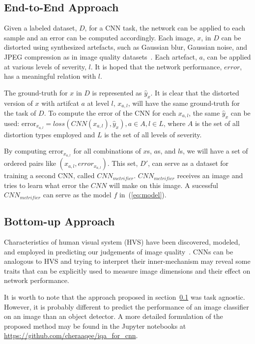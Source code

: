 \documentclass{article}
\begin{document}
\subsection{End-to-End Approach} \label{sec:end_to_end}
Given a labeled dataset, $D$, for a CNN task, the network can be applied to each sample and an error can be computed accordingly. Each image, $x$, in $D$ can be distorted using synthesized artefacts, such as Gaussian blur, Gaussian noise, and JPEG compression as in image quality datasets~\cite{sheikh2005live}. Each artefact, $a$, can be applied at various levels of severity, $l$. It is hoped that the network performance, $error$, has a meaningful relation with $l$.

The ground-truth for $x$ in $D$ is represented as $\hat{y}_x$. It is clear that the distorted version of $x$ with artifcat $a$ at level $l$, $x_{a, l}$, will have the same ground-truth for the task of $D$. To compute the error of the CNN for each $x_{a,l}$, the same $\hat{y}_x$ can be used: $\text{error}_{x_{a, l}} = loss(CNN(x_{a,l}), \hat{y}_x), a\in A, l\in L$, where $A$ is the set of all distortion types employed and $L$ is the set of all levels of severity.

By computing $\text{error}_{x_{a, l}}$ for all combinations of $x$s, $a$s, and $l$s, we will have a set of ordered pairs like $(x_{a, l}, error_{x_{a, l}})$. This set, $D\prime$, can serve as a dataset for training a second CNN, called $CNN_{metrifier}$. $CNN_{metrifier}$ receives an image and tries to learn what error the $CNN$ will make on this image. A sucessful $CNN_{metrifier}$ can serve as the model $f$ in~(\ref{eq:model}).
\subsection{Bottom-up Approach} \label{sec:bottom_up}
Characteristics of human visual system (HVS) have been discovered, modeled, and employed in predicting our judgements of image quality~\cite{zhai2020perceptual, fry2018bridging}. CNNs can be analogous to HVS and trying to interpret their inner-mechanism may reveal some traits that can be explicitly used to measure image dimensions and their effect on network performance.

It is worth to note that the approach proposed in section~\ref{sec:end_to_end} was task agnostic. However, it is probably different to predict the performance of an image classifier on an image than an object detector. A more detailed formulation of the proposed method may be found in the Jupyter notebooks at \href{https://github.com/cheraaqee/iqa\_for\_cnn}{https://github.com/cheraaqee/iqa\_for\_cnn}.
\end{document}
